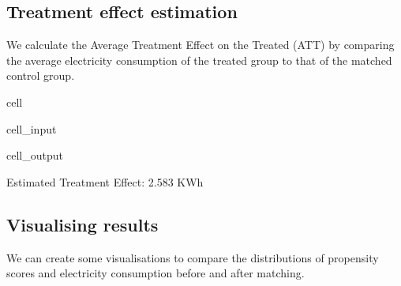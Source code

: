 \documentclass[letterpaper,10pt,english]{jupyterBook}
\begin{document}
\subsection{Treatment effect estimation}
\label{\detokenize{notebooks/propensity_scores:treatment-effect-estimation}}
\sphinxAtStartPar
We calculate the Average Treatment Effect on the Treated (ATT) by comparing the average electricity consumption of the treated group to that of the matched control group.

\begin{sphinxuseclass}{cell}\begin{sphinxVerbatimInput}

\begin{sphinxuseclass}{cell_input}
\begin{sphinxVerbatim}[commandchars=\\\{\}]
  \PYG{p}{[}\PYG{p}{]}  \PYG{p}{[}\PYG{p}{]}
\end{sphinxVerbatim}

\end{sphinxuseclass}\end{sphinxVerbatimInput}
\begin{sphinxVerbatimOutput}

\begin{sphinxuseclass}{cell_output}
\begin{sphinxVerbatim}[commandchars=\\\{\}]
Estimated Treatment Effect: \PYGZhy{}2.583 KWh
\end{sphinxVerbatim}

\end{sphinxuseclass}\end{sphinxVerbatimOutput}

\end{sphinxuseclass}

\subsection{Visualising results}
\label{\detokenize{notebooks/propensity_scores:visualising-results}}
\sphinxAtStartPar
We can create some visualisations to compare the distributions of propensity scores and electricity consumption before and after matching.
\end{document}
